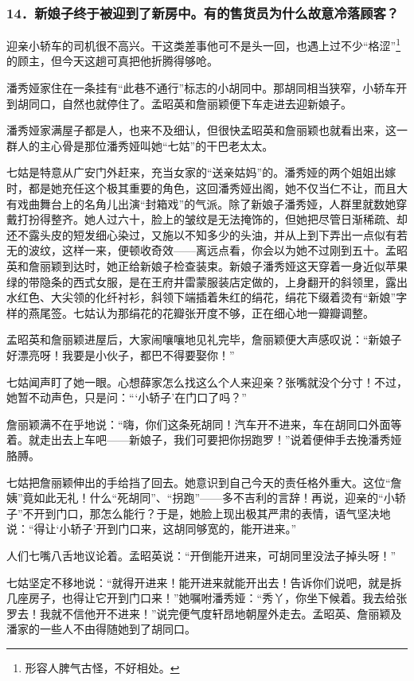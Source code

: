 \subsubsection*{14．新娘子终于被迎到了新房中。有的售货员为什么故意冷落顾客？}
\par 迎亲小轿车的司机很不高兴。干这类差事他可不是头一回，也遇上过不少“格涩”\footnote{形容人脾气古怪，不好相处。}的顾主，但今天这趟可真把他折腾得够呛。
\par 潘秀娅家住在一条挂有“此巷不通行”标志的小胡同中。那胡同相当狭窄，小轿车开到胡同口，自然也就停住了。孟昭英和詹丽颖便下车走进去迎新娘子。
\par 潘秀娅家满屋子都是人，也来不及细认，但很快孟昭英和詹丽颖也就看出来，这一群人的主心骨是那位潘秀娅叫她“七姑”的干巴老太太。
\par 七姑是特意从广安门外赶来，充当女家的“送亲姑妈”的。潘秀娅的两个姐姐出嫁时，都是她充任这个极其重要的角色，这回潘秀娅出阁，她不仅当仁不让，而且大有戏曲舞台上的名角儿出演“封箱戏”的气派。除了新娘子潘秀娅，人群里就数她穿戴打扮得整齐。她人过六十，脸上的皱纹是无法掩饰的，但她把尽管日渐稀疏、却还不露头皮的短发细心染过，又施以不知多少的头油，并从上到下弄出一点似有若无的波纹，这样一来，便顿收奇效——离远点看，你会以为她不过刚到五十。孟昭英和詹丽颖到达时，她正给新娘子检查装束。新娘子潘秀娅这天穿着一身近似苹果绿的带隐条的西式女服，是在王府井雷蒙服装店定做的，上身翻开的斜领里，露出水红色、大尖领的化纤衬衫，斜领下端插着朱红的绢花，绢花下缀着烫有“新娘”字样的燕尾签。七姑认为那绢花的花瓣张开度不够，正在细心地一瓣瓣调整。
\par 孟昭英和詹丽颖进屋后，大家闹嚷嚷地见礼完毕，詹丽颖便大声感叹说：“新娘子好漂亮呀！我要是小伙子，都巴不得要娶你！”
\par 七姑闻声盯了她一眼。心想薛家怎么找这么个人来迎亲？张嘴就没个分寸！不过，她暂不动声色，只是问：“‘小轿子’在门口了吗？”
\par 詹丽颖满不在乎地说：“嗨，你们这条死胡同！汽车开不进来，车在胡同口外面等着。就走出去上车吧——新娘子，我们可要把你拐跑罗！”说着便伸手去挽潘秀娅胳膊。
\par 七姑把詹丽颖伸出的手给挡了回去。她意识到自己今天的责任格外重大。这位“詹姨”竟如此无礼！什么“死胡同”、“拐跑”——多不吉利的言辞！再说，迎亲的“小轿子”不开到门口，那怎么能行？于是，她脸上现出极其严肃的表情，语气坚决地说：“得让‘小轿子’开到门口来，这胡同够宽的，能开进来。”
\par 人们七嘴八舌地议论着。孟昭英说：“开倒能开进来，可胡同里没法子掉头呀！”
\par 七姑坚定不移地说：“就得开进来！能开进来就能开出去！告诉你们说吧，就是拆几座房子，也得让它开到门口来！”她嘱咐潘秀娅：“秀丫，你坐下候着。我去给张罗去！我就不信他开不进来！”说完便气度轩昂地朝屋外走去。孟昭英、詹丽颖及潘家的一些人不由得随她到了胡同口。

